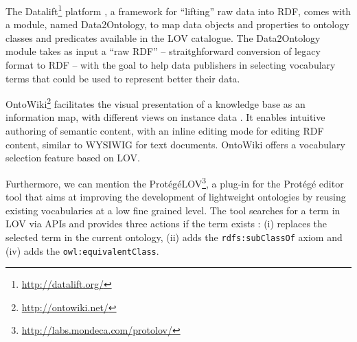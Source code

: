 \documentclass{iosart2c}
\begin{document}
The Datalift\footnote{\url{http://datalift.org/}} platform \cite{scharffe_2012}, a framework for ``lifting'' raw data into RDF, comes with a module, named Data2Ontology, to map data objects and properties to ontology classes and predicates available in the LOV catalogue. The Data2Ontology module takes as input a ``raw RDF'' -- straitghforward conversion of legacy format to RDF -- with the goal to help data publishers in selecting vocabulary terms that could be used to represent better their data.

OntoWiki\footnote{\url{http://ontowiki.net/}} facilitates the visual presentation of a knowledge base as an information map, with different views on instance data \cite{auer2006ontowiki}. It enables intuitive authoring of semantic content, with an inline editing mode for editing RDF content, similar to WYSIWIG for text documents. OntoWiki offers a vocabulary selection feature based on LOV.

Furthermore, we can mention the Prot{\'e}g{\'e}LOV\footnote{\url{http://labs.mondeca.com/protolov/}}, a plug-in for the Prot{\'e}g{\'e} editor tool \cite{prolov2015} that aims at improving the development of lightweight ontologies by reusing existing vocabularies at a low fine grained level. The tool searches for a term in LOV via APIs and provides three actions if the term exists : (i) replaces the selected term in the current ontology, (ii) adds the {\small\texttt{rdfs:subClassOf}} axiom and (iv) adds the {\small\texttt{owl:equivalentClass}}.
\end{document}
